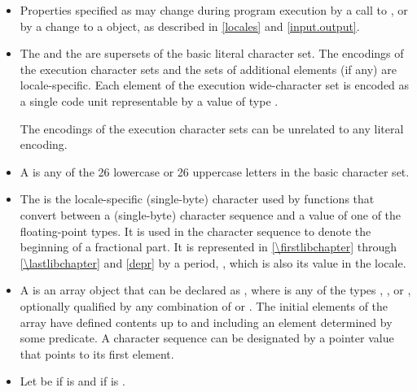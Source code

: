 \begin{itemize}
\item
Properties specified as 
may change during program execution
by a call to , or
by a change to a  object,
as described in \ref{locales} and \ref{input.output}.
\item
The  and
the 
are supersets of the basic literal character set.
The encodings of the execution character sets and
the sets of additional elements (if any) are locale-specific.
Each element of the execution wide-character set is encoded as
a single code unit representable by a value of type .
\begin{note}
The encodings of the execution character sets can be unrelated
to any literal encoding.
\end{note}
\item
A  is any of the 26 lowercase or 26
%
%
uppercase letters in the basic character set.
\item
The
is the locale-specific
(single-byte) character used by functions that convert between a (single-byte)
character sequence and a value of one of the floating-point types.
It is used
in the character sequence to denote the beginning of a fractional part.
It is
represented in \ref{\firstlibchapter} through \ref{\lastlibchapter}
and \ref{depr} by a period,
%
,
which is
also its value in the 
locale.
\item
A
is an array object  that
can be declared as
,
where  is any of the types
,
,
or
, optionally qualified by any combination of
or
.
The initial elements of the
array have defined contents up to and including an element determined by some
predicate.
A character sequence can be designated by a pointer value
 that points to its first element.
\item
{}%
Let  be
 if  is  and
 if  is .
\end{itemize}

